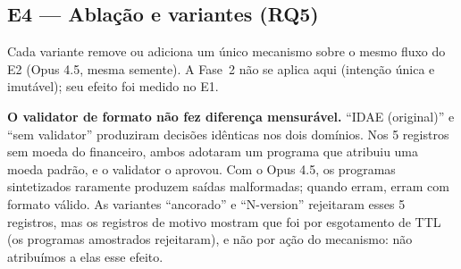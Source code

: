 \documentclass[sigconf,nonacm]{acmart}
\begin{document}
\subsection{E4 --- Ablação e variantes (RQ5)}

Cada variante remove ou adiciona um único mecanismo sobre o mesmo fluxo do E2 (Opus 4.5, mesma semente). A Fase~2 não se aplica aqui (intenção única e imutável); seu efeito foi medido no E1.

\begin{table}[h]
\caption{E4 --- Ablação ($n=550$ por domínio; ``sem amortização'' na subamostra de 150, cujo máximo de ``Correto'' é 76,7\%)}
\label{tab:e4}
\end{table}

\textbf{O validator de formato não fez diferença mensurável.} ``IDAE (original)'' e ``sem validator'' produziram decisões idênticas nos dois domínios. Nos 5 registros sem moeda do financeiro, ambos adotaram um programa que atribuiu uma moeda padrão, e o validator o aprovou. Com o Opus 4.5, os programas sintetizados raramente produzem saídas malformadas; quando erram, erram com formato válido. As variantes ``ancorado'' e ``N-version'' rejeitaram esses 5 registros, mas os registros de motivo mostram que foi por esgotamento de TTL (os programas amostrados rejeitaram), e não por ação do mecanismo: não atribuímos a elas esse efeito.
\end{document}
